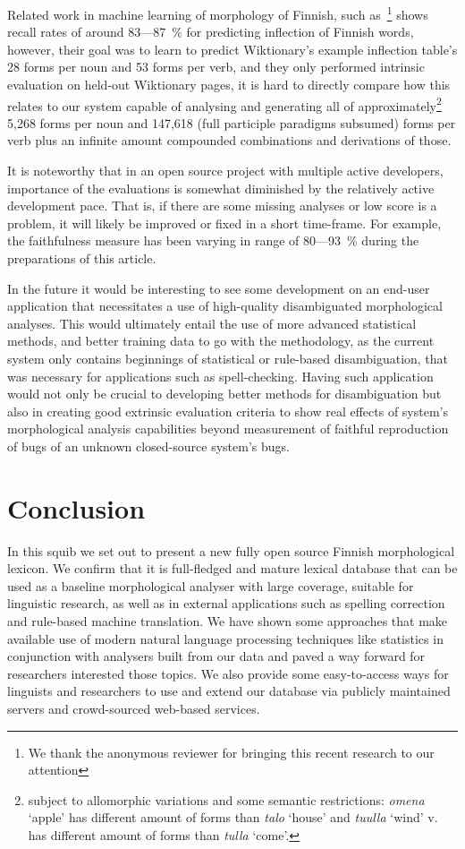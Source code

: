 \documentclass[a4paper,12pt]{article}
\begin{document}
Related work in machine learning of morphology of Finnish, such
as~\cite{durrett2013supervised}\footnote{We thank the anonymous reviewer for
bringing this recent research to our attention} shows recall rates of around
83---87~\% for predicting inflection of Finnish words, however, their goal was
to learn to predict Wiktionary's example inflection table's 28 forms per noun
and 53 forms per verb, and they only performed intrinsic evaluation on held-out
Wiktionary pages, it is hard to directly compare how this relates to our system
capable of analysing and generating all of approximately\footnote{subject to
    allomorphic variations and some semantic restrictions: \emph{omena} `apple'
    has different amount of forms than \emph{talo} `house' and \emph{tuulla}
`wind' v. has different amount of forms than \emph{tulla} `come'.} 5,268 forms
per noun and 147,618 (full participle paradigms subsumed) forms per verb plus
an infinite amount compounded combinations and derivations of those.

It is noteworthy that in an open source project with multiple active
developers, importance of the evaluations is somewhat diminished by the
relatively active development pace. That is, if there are some missing analyses
or low score is a problem, it will likely be improved or fixed in a short
time-frame. For example, the faithfulness measure has been varying in range of
80---93~\% during the preparations of this article.

In the future it would be interesting to see some development on an end-user
application that necessitates a use of high-quality disambiguated morphological
analyses. This would ultimately entail the use of more advanced statistical methods, and
better training data to go with the methodology, as the current system only
contains beginnings of statistical or rule-based disambiguation, that was
necessary for applications such as spell-checking.  Having such application would
not only be crucial to developing better methods for disambiguation but also in
creating good extrinsic evaluation criteria to show real effects of system's
morphological analysis capabilities beyond measurement of faithful reproduction
of bugs of an unknown closed-source system's bugs.

\section{Conclusion}
\label{sec:conclusion}

In this squib we set out to present a new fully open source Finnish
morphological lexicon. We confirm that it is full-fledged and mature lexical
database that can be used as a baseline morphological analyser with large
coverage, suitable for linguistic research, as well as in external applications such as spelling correction and rule-based machine translation. We have shown
some approaches that make available use of modern natural language processing
techniques like statistics in conjunction with analysers built from our data
and paved a way forward for researchers interested those topics. We also provide
some easy-to-access ways for linguists and researchers to use and extend our
database via publicly maintained servers and crowd-sourced web-based services.
\end{document}

